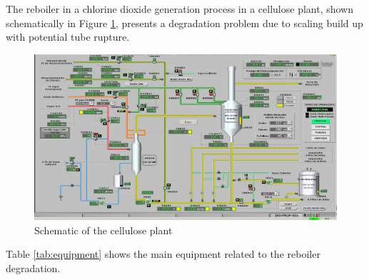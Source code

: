 \documentclass[a4paper,fleqn]{cas-sc}
\begin{document}
	The reboiler in a chlorine dioxide generation process in a cellulose plant, shown schematically in Figure \ref{fig:cellulose-plant}, presents a degradation problem due to scaling build up with potential tube rupture. 
	
	\begin{figure}[h]
		\centering
		\includegraphics[width=1\linewidth]{figures/cellulose-plant.jpg}
		\caption{Schematic of the cellulose plant}
		\label{fig:cellulose-plant}
	\end{figure}

	Table \ref{tab:equipment} shows the main equipment related to the reboiler degradation.
	
\end{document}
